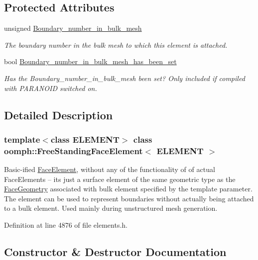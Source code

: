 \subsection*{Protected Attributes}
\begin{DoxyCompactItemize}
\item 
unsigned \hyperlink{classoomph_1_1FreeStandingFaceElement_a8326eccc4018fcc1df6729a439549aa3}{Boundary\+\_\+number\+\_\+in\+\_\+bulk\+\_\+mesh}
\begin{DoxyCompactList}\small\item\em The boundary number in the bulk mesh to which this element is attached. \end{DoxyCompactList}\item 
bool \hyperlink{classoomph_1_1FreeStandingFaceElement_ad11e687447855005a5d79651c1aeb3b7}{Boundary\+\_\+number\+\_\+in\+\_\+bulk\+\_\+mesh\+\_\+has\+\_\+been\+\_\+set}
\begin{DoxyCompactList}\small\item\em Has the Boundary\+\_\+number\+\_\+in\+\_\+bulk\+\_\+mesh been set? Only included if compiled with P\+A\+R\+A\+N\+O\+ID switched on. \end{DoxyCompactList}\end{DoxyCompactItemize}


\subsection{Detailed Description}
\subsubsection*{template$<$class E\+L\+E\+M\+E\+NT$>$\newline
class oomph\+::\+Free\+Standing\+Face\+Element$<$ E\+L\+E\+M\+E\+N\+T $>$}

Basic-\/ified \hyperlink{classoomph_1_1FaceElement}{Face\+Element}, without any of the functionality of of actual Face\+Elements -- it\textquotesingle{}s just a surface element of the same geometric type as the \hyperlink{classoomph_1_1FaceGeometry}{Face\+Geometry} associated with bulk element specified by the template parameter. The element can be used to represent boundaries without actually being attached to a bulk element. Used mainly during unstructured mesh generation. 

Definition at line 4876 of file elements.\+h.



\subsection{Constructor \& Destructor Documentation}
\mbox{\label{classoomph_1_1FreeStandingFaceElement_a9d87193db8d21a358eb6a0aa9881b90a}} 
